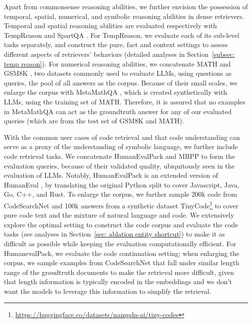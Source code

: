 \documentclass{article} %
\begin{document}
Apart from commonsense reasoning abilities, we further envision the possession of temporal, spatial, numerical, and symbolic reasoning abilities in dense retrievers. Temporal and spatial reasoning abilities are evaluated respectively with TempReason \citep{tan2023towards} and SpartQA \citep{mirzaee2021spartqa}. For TempReason, we evaluate each of its sub-level tasks separately, and construct the pure, fact and context settings to assess different aspects of retrievers' behaviors (detailed analyses in Section~\ref{subsec: temp reason}). For numerical reasoning abilities, we concatenate MATH \citep{hendrycks2021measuring} and GSM8K \citep{cobbe2021training}, two datasets commonly used to evaluate LLMs, using questions as queries, the pool of all answers as the corpus. Because of their small scales, we enlarge the corpus with MetaMathQA \citep{yu2023metamath}, which is created synthetically with LLMs, using the training set of MATH. Therefore, it is assured that no examples in MetaMathQA can act as the groundtruth answer for any of our evaluated queries (which are from the test set of GSM8K and MATH). 

With the common user cases of code retrieval and that code understanding can serve as a proxy of the understanding of symbolic language, we further include code retrieval tasks. We concatenate HumanEvalPack \citep{muennighoff2023octopack} and MBPP \citep{austin2021program} to form the evaluation queries, because of their validated quality, ubiquitously seen in the evaluation of LLMs. Notably, HumanEvalPack \citep{muennighoff2023octopack} is an extended version of HumanEval \citep{chen2021evaluating}, by translating the original Python split to cover Javascript, Java, Go, C++, and Rust. To enlarge the corpus, we further sample 200k code from CodeSearchNet \citep{husain2019codesearchnet} and 100k answers from a synthetic dataset TinyCode\footnote{\url{https://huggingface.co/datasets/nampdn-ai/tiny-codes}} to cover pure code text and the mixture of natural language and code. We extensively explore the optimal setting to construct the code corpus and evaluate the code tasks (see analyses in Section~\ref{sec: ablation entity shortcut}) to make it as difficult as possible while keeping the evaluation computationally efficient. For HumanevalPack, we evaluate the code continuation setting; when enlarging the corpus, we sample examples from CodeSearchNet that fall under similar length range of the groudtruth documents to make the retrieval more difficult, given that length information is typically encoded in the embeddings \citep{xiao2023length} and we don't want the models to leverage this information to simplify the retrieval.
\end{document}
